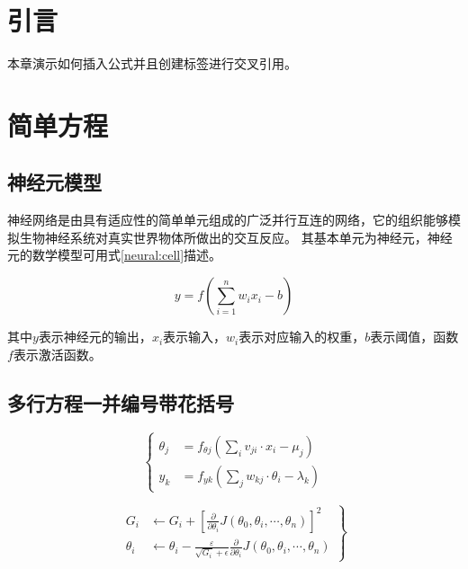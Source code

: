 
\newcommand{\sigmoid}[1]{\sigma\left(#1\right)}
\newcommand{\gatefunction}[1]{\sigmoid{W_{x#1}\,x_t + W_{h#1}\,h_{t-1} + b_{#1}}}
\newcommand{\mat}[1]{\mathbf{#1}}

\section{引言}

本章演示如何插入公式并且创建标签进行交叉引用。

\section{简单方程}

\subsection{神经元模型}

神经网络是由具有适应性的简单单元组成的广泛并行互连的网络，它的组织能够模拟生物神经系统对真实世界物体所做出的交互反应。%
其基本单元为神经元，神经元的数学模型可用式\ref{neural:cell}描述。

\begin{equation}
    y = f \left( \sum_{i=1}^n w_i x_i - b \right)
    \label{neural:cell}
\end{equation}

\noindent 其中\(y\)表示神经元的输出，\(x_i\)表示输入，\(w_i\)表示对应输入的权重，\(b \)表示阈值，函数\(f\)表示激活函数。

\subsection{多行方程一并编号带花括号}

\begin{equation}
    \left\{
        \begin{aligned}
            \theta_j &= f_{\theta j} \left(\sum_{i}v_{ji} \cdot x_i - \mu_j \right) \\
            y_k &= f_{yk}  \left(\sum_{j}w_{kj} \cdot \theta_i - \lambda_k \right)
        \end{aligned} 
    \right.
    \label{neural:multi_layers}
\end{equation}

\begin{equation}
    \left.
    \begin{aligned}
        G_i & \leftarrow G_i + \left[\frac{\partial}{\partial \theta_i} J\left(
            \theta_0, \theta_i, \cdots, \theta_n
        \right)\right]^2 \\
        \theta_i & \leftarrow \theta_i - \frac{\varepsilon}{\sqrt{G_i} + \epsilon} \frac{\partial}{\partial \theta_i} J\left(
            \theta_0, \theta_i, \cdots, \theta_n
        \right)
    \end{aligned}
    \right\}
    \label{adagrad:defination}
\end{equation}



